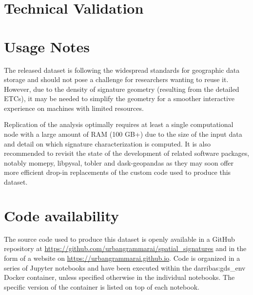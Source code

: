 \documentclass[fleqn,10pt]{wlscirep}
\begin{document}



\section*{Technical Validation}





\section*{Usage Notes}

The released dataset is following the widespread standards for geographic data storage and
should not pose a challenge for researchers wanting to reuse it. However, due to the density of
signature geometry (resulting from the detailed ETCs), it may be needed to simplify the
geometry for a smoother interactive experience on machines with limited resources.

Replication of the analysis optimally requires at least a single computational node with
a large amount of RAM (100 GB+) due to the size of the input data and detail on which
signature characterization is computed. It is also recommended to revisit the state of
the development of related software packages, notably momepy, libpysal, tobler and
dask-geopandas as they may soon offer more efficient drop-in replacements
of the custom code used to produce this dataset.

\section*{Code availability}

The source code used to produce this dataset is openly available in a GitHub repository
at
\hyperlink{https://github.com/urbangrammarai/spatial\_signatures}{https://github.com/urbangrammarai/spatial\_signatures}
and in the form of a website on
\hyperlink{https://urbangrammarai.github.io}{https://urbangrammarai.github.io}.
Code is
organized in a series of Jupyter notebooks and have been executed within the darribas:gds\_env
Docker container, unless specified otherwise in the individual notebooks. The specific version
of the container is listed on top of each notebook.
\end{document}
